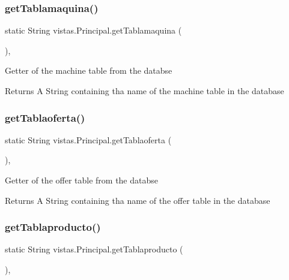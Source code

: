 \subsubsection{\texorpdfstring{get\+Tablamaquina()}{getTablamaquina()}}
{\footnotesize\ttfamily static String vistas.\+Principal.\+get\+Tablamaquina (\begin{DoxyParamCaption}{ }\end{DoxyParamCaption})\hspace{0.3cm}{\ttfamily [inline]}, {\ttfamily [static]}}

Getter of the machine table from the databse \begin{DoxyReturn}{Returns}
A String containing tha name of the machine table in the database 
\end{DoxyReturn}
\mbox{\label{classvistas_1_1_principal_afe7ddf018ad429301b1aca1dbfc4770d}} 
\subsubsection{\texorpdfstring{get\+Tablaoferta()}{getTablaoferta()}}
{\footnotesize\ttfamily static String vistas.\+Principal.\+get\+Tablaoferta (\begin{DoxyParamCaption}{ }\end{DoxyParamCaption})\hspace{0.3cm}{\ttfamily [inline]}, {\ttfamily [static]}}

Getter of the offer table from the databse \begin{DoxyReturn}{Returns}
A String containing tha name of the offer table in the database 
\end{DoxyReturn}
\mbox{\label{classvistas_1_1_principal_a39c3c478060c985a23f97e38dc88e61b}} 
\subsubsection{\texorpdfstring{get\+Tablaproducto()}{getTablaproducto()}}
{\footnotesize\ttfamily static String vistas.\+Principal.\+get\+Tablaproducto (\begin{DoxyParamCaption}{ }\end{DoxyParamCaption})\hspace{0.3cm}{\ttfamily [inline]}, {\ttfamily [static]}}

